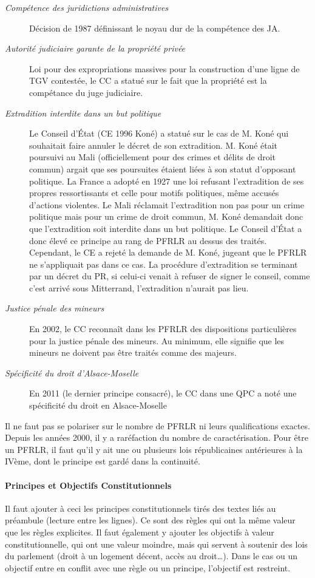 \documentclass[math]{cours}
\begin{document}
\begin{description}
	\item[\emph{Compétence des juridictions administratives}] Décision de 1987 définissant le noyau dur de la compétence des JA.
	\item[\emph{Autorité judiciaire garante de la propriété privée}] Loi pour des expropriations massives pour la construction d'une ligne de TGV contestée, le CC a statué sur le fait que la propriété est la compétance du juge judiciaire.
	\item[\emph{Extradition interdite dans un but politique}] Le Conseil d'État (CE 1996 Koné) a statué sur le cas de M. Koné qui souhaitait faire annuler le décret de son extradition.
		M. Koné était poursuivi au Mali (officiellement pour des crimes et délits de droit commun) argait que ses poursuites étaient liées à son statut d'opposant politique.
		La France a adopté en 1927 une loi refusant l'extradition de ses propres ressortissants et celle pour motifs politiques, même accusés d'actions violentes.
		Le Mali réclamait l'extradition non pas pour un crime politique mais pour un crime de droit commun, M. Koné demandait donc que l'extradition soit interdite dans un but politique.
		Le Conseil d'État a donc élevé ce principe au rang de PFRLR au dessus des traités.
		Cependant, le CE a rejeté la demande de M. Koné, jugeant que le PFRLR ne s'appliquait pas dans ce cas.
		La procédure d'extradition se terminant par un décret du PR, si celui-ci venait à refuser de signer le conseil, comme c'est arrivé sous Mitterrand, l'extradition n'aurait pas lieu.
	\item[\emph{Justice pénale des mineurs}] En 2002, le CC reconnaît dans les PFRLR des dispositions particulières pour la justice pénale des mineurs.
		Au minimum, elle signifie que les mineurs ne doivent pas être traités comme des majeurs.
	\item[\emph{Spécificité du droit d'Alsace-Moselle}] En 2011 (le dernier principe consacré), le CC dans une QPC a noté une spécificité du droit en Alsace-Moselle
\end{description}
Il ne faut pas se polariser sur le nombre de PFRLR ni leurs qualifications exactes.
Depuis les années 2000, il y a raréfaction du nombre de caractérisation.
Pour être un PFRLR, il faut qu'il y ait une ou plusieurs lois républicaines antérieures à la IVème, dont le principe est gardé dans la continuité.

\paragraph{Principes et Objectifs Constitutionnels}
Il faut ajouter à ceci les principes constitutionnels tirés des textes liés au préambule (lecture entre les lignes).
Ce sont des règles qui ont la même valeur que les règles explicites.
Il faut également y ajouter les objectifs à valeur constitutionnelle, qui ont une valeur moindre, mais qui servent à soutenir des lois du parlement (droit à un logement décent, accès au droit\ldots).
Dans le cas ou un objectif entre en conflit avec une règle ou un principe, l'objectif est restreint.
\end{document}
